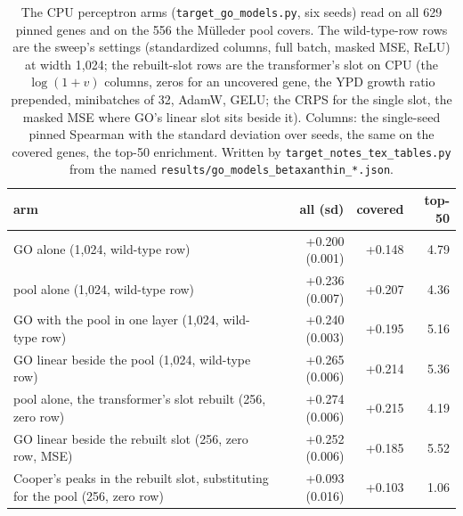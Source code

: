\begin{table}[H]
  \centering
  \footnotesize
  \caption[The perceptron arms on the genes the pool covers]{The CPU perceptron arms (\texttt{target\_go\_models.py}, six seeds) read on all 629 pinned genes and on the 556 the M\"ulleder pool covers. The wild-type-row rows are the sweep's settings (standardized columns, full batch, masked MSE, ReLU) at width 1,024; the rebuilt-slot rows are the transformer's slot on CPU (the $\log(1+v)$ columns, zeros for an uncovered gene, the YPD growth ratio prepended, minibatches of 32, AdamW, GELU; the CRPS for the single slot, the masked MSE where GO's linear slot sits beside it). Columns: the single-seed pinned Spearman with the standard deviation over seeds, the same on the covered genes, the top-50 enrichment. Written by \texttt{target\_notes\_tex\_tables.py} from the named \texttt{results/go\_models\_betaxanthin\_*.json}.}
  \label{tab:covered-perceptrons}
  \begin{tabular}{@{}lrrr@{}}
    \hline
    arm & all (sd) & covered & top-50 \\
    \hline
    GO alone (1,024, wild-type row) & +0.200 (0.001) & +0.148 & 4.79 \\
    pool alone (1,024, wild-type row) & +0.236 (0.007) & +0.207 & 4.36 \\
    GO with the pool in one layer (1,024, wild-type row) & +0.240 (0.003) & +0.195 & 5.16 \\
    GO linear beside the pool (1,024, wild-type row) & +0.265 (0.006) & +0.214 & 5.36 \\
    pool alone, the transformer's slot rebuilt (256, zero row) & +0.274 (0.006) & +0.215 & 4.19 \\
    GO linear beside the rebuilt slot (256, zero row, MSE) & +0.252 (0.006) & +0.185 & 5.52 \\
    Cooper's peaks in the rebuilt slot, substituting for the pool (256, zero row) & +0.093 (0.016) & +0.103 & 1.06 \\
    \hline
  \end{tabular}
\end{table}
